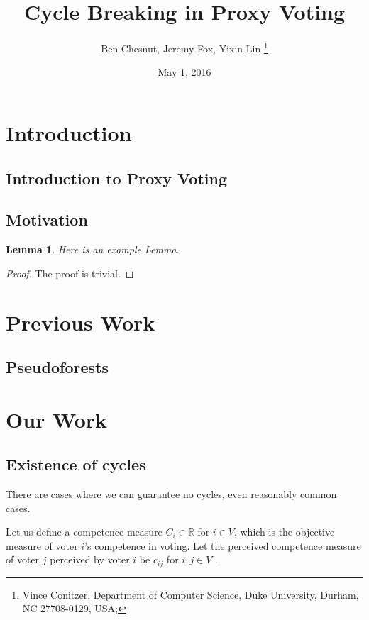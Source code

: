 \documentclass[10pt]{article}
\newtheorem{lemma}[theorem]{Lemma}
\begin{document}
  
\title{Cycle Breaking in Proxy Voting
}
\date{May 1, 2016}

\author{
Ben Chesnut, Jeremy Fox, Yixin Lin \thanks{%
Vince Conitzer, Department of Computer Science, Duke University, Durham, NC
27708-0129, USA;}}

\maketitle

\section{Introduction}

\subsection{Introduction to Proxy Voting}

\subsection{Motivation}

\begin{lemma}
Here is an example Lemma.
\end{lemma}
\begin{proof}
The proof is trivial.
\end{proof}
\cite{test}

\section{Previous Work}


\subsection{Pseudoforests}


\section{Our Work}

\subsection{Existence of cycles}

There are cases where we can guarantee no cycles, even reasonably common cases.

Let us define a competence measure $C_i \in \mathbb{R}$ for $ i \in V$, which is the objective measure of voter $i$'s competence in voting. Let the perceived competence measure of voter $j$ perceived by voter $i$ be $c_{ij}$ for $i, j \in V$ . 
\end{document}
